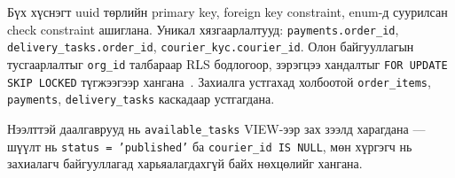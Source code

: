 Бүх хүснэгт uuid төрлийн primary key, foreign key constraint, enum-д суурилсан check constraint ашиглана. Уникал хязгаарлалтууд: \texttt{payments.order\_id}, \texttt{delivery\_tasks.order\_id}, \texttt{courier\_kyc.courier\_id}. Олон байгууллагын тусгаарлалтыг \texttt{org\_id} талбараар RLS бодлогоор, зэрэгцээ хандалтыг \texttt{FOR UPDATE SKIP LOCKED} түгжээгээр хангана~\cite{postgresql2024locking, kleppmann2017ddia}. Захиалга устгахад холбоотой \texttt{order\_items}, \texttt{payments}, \texttt{delivery\_tasks} каскадаар устгагдана.

Нээлттэй даалгаврууд нь \texttt{available\_tasks} VIEW-ээр зах зээлд харагдана — шүүлт нь \texttt{status = 'published'} ба \texttt{courier\_id IS NULL}, мөн хүргэгч нь захиалагч байгууллагад харьяалагдахгүй байх нөхцөлийг хангана.

